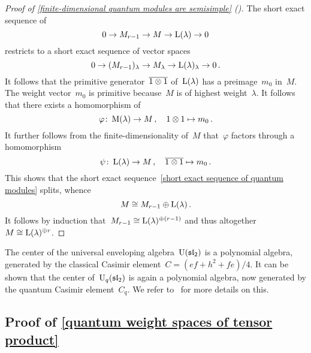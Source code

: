 \documentclass[a4paper, 11pt, oneside]{scrartcl}
\begin{document}
\begin{proof}[Proof of \cref{finite-dimensional quantum modules are semisimple} ({\cite[Theorem~2.9]{jantzen_quantum}})]
  The short exact sequence of~
  \begin{equation}
    \label{short exact sequence of quantum modules}
    0
    \to
    M_{r-1}
    \to
    M
    \to
    \operatorname{L}(\lambda)
    \to
    0
  \end{equation}
  restricts to a short exact sequence of vector spaces
  \[
    0
    \to
    ( M_{r-1} )_\lambda
    \to
    M_\lambda
    \to
    \operatorname{L}(\lambda)_\lambda
    \to
    0 \,.
  \]
  It follows that the primitive generator~$\overline{1 \otimes 1}$ of~$\operatorname{L}(\lambda)$ has a preimage~$m_0$ in~$M$.
  The weight vector~$m_0$ is primitive because~$M$ is of highest weight~$\lambda$.
  It follows that there exists a homomorphism of~
  \[
    \varphi
    \colon
    \operatorname{M}(\lambda)
    \to
    M
    \,,
    \quad
    1 \otimes 1
    \mapsto
    m_0 \,.
  \]
  It further follows from the finite-dimensionality of~$M$ that~$\varphi$ factors through a homomorphism
  \[
    \psi
    \colon
    \operatorname{L}(\lambda)
    \to
    M
    \,,
    \quad
    \overline{1 \otimes 1}
    \mapsto
    m_0 \,.
  \]
  This shows that the short exact sequence~\eqref{short exact sequence of quantum modules} splits, whence
  \[
    M \cong M_{r-1} \oplus \operatorname{L}(\lambda) \,.
  \]
  It follows by induction that~$M_{r-1} \cong \operatorname{L}(\lambda)^{\oplus (r-1)}$ and thus altogether~$M \cong \operatorname{L}(\lambda)^{\oplus r}$.
\end{proof}

\begin{remark}
  The center of the universal enveloping algebra~$\operatorname{U}(\mathfrak{sl}_2)$ is a polynomial algebra, generated by the classical Casimir element~$C = (ef + h^2 + fe)/4$.
  It can be shown that the center of~$\operatorname{U}_q(\mathfrak{sl}_2)$ is again a polynomial algebra, now generated by the quantum Casimir element~$C_q$.
  We refer to~\cite[Proposition~2.18]{jantzen_quantum} for more details on this.
\end{remark}



\subsection{Proof of \cref{quantum weight spaces of tensor product}}
\label{proof of quantum weight spaces of tensor product}
\end{document}
